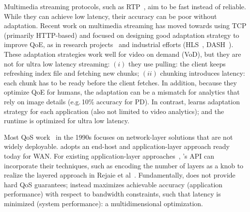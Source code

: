  Multimedia streaming protocols, such as
RTP~\cite{schulzrinne2006rtp}, aim to be fast instead of reliable. While they
can achieve low latency, their accuracy can be poor without adaptation.  Recent
work on multimedia streaming has moved towards using TCP (primarily HTTP-based)
and focused on designing good adaptation strategy to improve QoE, as in research
projects~\cite{mao2017neural, sun2016cs2p, yin2015control} and industrial
efforts (HLS~\cite{pantos2016http}, DASH~\cite{sodagar2011mpeg,
  michalos2012dynamic}). These adaptation strategies work well for video on
demand (VoD), but they are not for ultra low latency streaming: $(i)$ they use
pulling: the client keeps refreshing index file and fetching new chunks; $(ii)$
chunking introduces latency: each chunk has to be ready before the client
fetches.  In addition, because they optimize QoE for humans, the adaptation can
be a mismatch for analytics that rely on image details (e.g.\,10\% accuracy for
PD). In contrast, \sysname{} learns adaptation strategy for each application
(also not limited to video analytics); and the runtime is optimized for ultra
low latency.

 Most QoS work~\cite{ferrari1990scheme, shenker1994integrated,
  shenker1995fundamental} in the 1990s focuses on network-layer solutions that
are not widely deployable. \sysname{} adopts an end-host and application-layer
approach ready today for WAN. For existing application-layer
approaches~\cite{vandalore2001survey}, \sysname{}'s API can incorporate their
techniques, such as encoding the number of layers as a knob to realize the
layered approach in Rejaie et al~\cite{rejaie2000layered}. Fundamentally,
\sysname{} does not provide hard QoS guarantees; instead \sysname{} maximizes
achievable accuracy (application performance) with respect to bandwidth
constraints, such that latency is minimized (system performance): a
multidimensional optimization.




